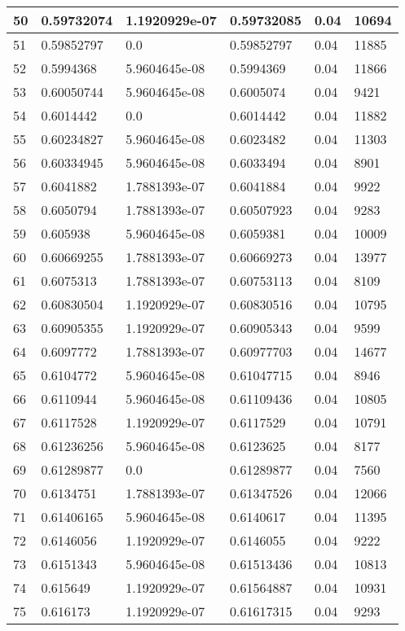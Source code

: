 \begin{longtable}{|l|l|l|l|l|l|}
50 & 0.59732074 & 1.1920929e-07 & 0.59732085 & 0.04 & 10694 \\ \hline 
51 & 0.59852797 & 0.0 & 0.59852797 & 0.04 & 11885 \\ \hline 
52 & 0.5994368 & 5.9604645e-08 & 0.5994369 & 0.04 & 11866 \\ \hline 
53 & 0.60050744 & 5.9604645e-08 & 0.6005074 & 0.04 & 9421 \\ \hline 
54 & 0.6014442 & 0.0 & 0.6014442 & 0.04 & 11882 \\ \hline 
55 & 0.60234827 & 5.9604645e-08 & 0.6023482 & 0.04 & 11303 \\ \hline 
56 & 0.60334945 & 5.9604645e-08 & 0.6033494 & 0.04 & 8901 \\ \hline 
57 & 0.6041882 & 1.7881393e-07 & 0.6041884 & 0.04 & 9922 \\ \hline 
58 & 0.6050794 & 1.7881393e-07 & 0.60507923 & 0.04 & 9283 \\ \hline 
59 & 0.605938 & 5.9604645e-08 & 0.6059381 & 0.04 & 10009 \\ \hline 
60 & 0.60669255 & 1.7881393e-07 & 0.60669273 & 0.04 & 13977 \\ \hline 
61 & 0.6075313 & 1.7881393e-07 & 0.60753113 & 0.04 & 8109 \\ \hline 
62 & 0.60830504 & 1.1920929e-07 & 0.60830516 & 0.04 & 10795 \\ \hline 
63 & 0.60905355 & 1.1920929e-07 & 0.60905343 & 0.04 & 9599 \\ \hline 
64 & 0.6097772 & 1.7881393e-07 & 0.60977703 & 0.04 & 14677 \\ \hline 
65 & 0.6104772 & 5.9604645e-08 & 0.61047715 & 0.04 & 8946 \\ \hline 
66 & 0.6110944 & 5.9604645e-08 & 0.61109436 & 0.04 & 10805 \\ \hline 
67 & 0.6117528 & 1.1920929e-07 & 0.6117529 & 0.04 & 10791 \\ \hline 
68 & 0.61236256 & 5.9604645e-08 & 0.6123625 & 0.04 & 8177 \\ \hline 
69 & 0.61289877 & 0.0 & 0.61289877 & 0.04 & 7560 \\ \hline 
70 & 0.6134751 & 1.7881393e-07 & 0.61347526 & 0.04 & 12066 \\ \hline 
71 & 0.61406165 & 5.9604645e-08 & 0.6140617 & 0.04 & 11395 \\ \hline 
72 & 0.6146056 & 1.1920929e-07 & 0.6146055 & 0.04 & 9222 \\ \hline 
73 & 0.6151343 & 5.9604645e-08 & 0.61513436 & 0.04 & 10813 \\ \hline 
74 & 0.615649 & 1.1920929e-07 & 0.61564887 & 0.04 & 10931 \\ \hline 
75 & 0.616173 & 1.1920929e-07 & 0.61617315 & 0.04 & 9293 \\ \hline 
\end{longtable}